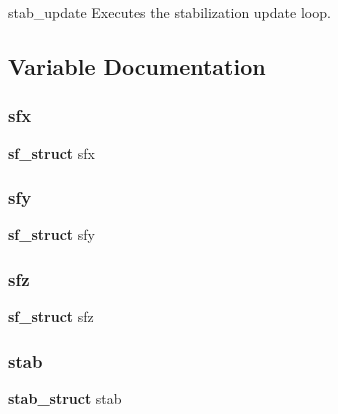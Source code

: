 stab\+\_\+update Executes the stabilization update loop. 

\subsection{Variable Documentation}
\mbox{\label{stab_8h_ab17122dc3702b705572784deecc4649e}} 
\subsubsection{sfx}
{\footnotesize\ttfamily \textbf{ sf\+\_\+struct} sfx}

\mbox{\label{stab_8h_ac0d1e80854554b794185c06e9eb58d31}} 
\subsubsection{sfy}
{\footnotesize\ttfamily \textbf{ sf\+\_\+struct} sfy}

\mbox{\label{stab_8h_a758fa43674ca53a6c00b5ad7e97a0ed7}} 
\subsubsection{sfz}
{\footnotesize\ttfamily \textbf{ sf\+\_\+struct} sfz}

\mbox{\label{stab_8h_a28a2e26f795d256efbaba977ed8e3f1d}} 
\subsubsection{stab}
{\footnotesize\ttfamily \textbf{ stab\+\_\+struct} stab}

